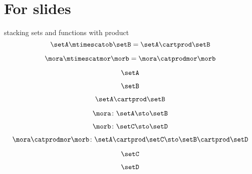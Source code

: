 
\section[For slides]{For slides}

\begin{forslides}

stacking sets and functions with product
    \begin{equation}
        \label{eq:combination-000}
        \setA \mtimescatob \setB = \setA \cartprod \setB
    \end{equation}

    \begin{equation}
        \label{eq:combination-001}
        \mora \mtimescatmor \morb = \mora \catprodmor \morb
    \end{equation}

    \begin{equation}
        \label{eq:combination-002}
        \setA 
    \end{equation}

    \begin{equation}
        \label{eq:combination-003}
        \setB 
    \end{equation}

    \begin{equation}
        \label{eq:combination-004}
       \setA \cartprod \setB
    \end{equation}

    \begin{equation}
        \label{eq:combination-005}
        \mora \colon \setA \sto \setB 
    \end{equation}

    \begin{equation}
        \label{eq:combination-006}
        \morb \colon \setC \sto \setD 
    \end{equation}

    \begin{equation}
        \label{eq:combination-007}
        \mora \catprodmor \morb \colon \setA \cartprod \setC \sto \setB \cartprod \setD 
    \end{equation}

    \begin{equation}
        \label{eq:combination-008}
       \setC
    \end{equation}

    \begin{equation}
        \label{eq:combination-009}
         \setD
    \end{equation}


\end{forslides}
